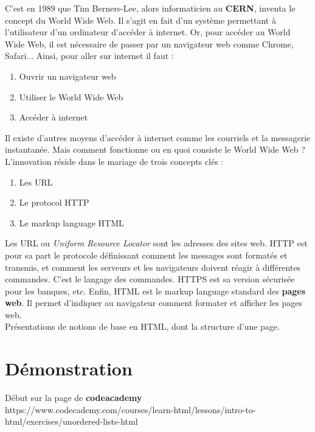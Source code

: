 \documentclass[12pt]{report}
\begin{document}
     C'est en 1989 que Tim Berners-Lee, alors informaticien au \textbf{CERN}, inventa le concept du World Wide Web. Il s'agit en fait d'un système permettant à l'utilisateur d'un ordinateur d'accéder à internet. Or, pour accéder au World Wide Web, il est nécessaire de passer par un navigateur web comme Chrome, Safari... Ainsi, pour aller sur internet il faut : \\
     \begin{enumerate}
      \item Ouvrir un navigateur web
      \item Utiliser le World Wide Web
      \item Accéder à internet
     \end{enumerate}
   Il existe d'autres moyens d'accéder à internet comme les courriels et la messagerie instantanée. Mais comment fonctionne ou en quoi consiste le World Wide Web ? \\ 
     
   L'innovation réside dans le mariage de trois concepts clés : \\
     \begin{enumerate}
      \item Les URL
      \item Le protocol HTTP
      \item Le markup language HTML
     \end{enumerate}
    
    Les URL ou \textit{Uniform Resource Locator} sont les adresses des sites web. HTTP est pour sa part le protocole définissant comment les messages sont formatés et transmis, et comment les serveurs et les navigateurs doivent réagir à différentes commandes. C'est le langage des commandes. HTTPS est sa version sécurisée pour les banques, etc. Enfin, HTML est le markup language standard des \textbf{pages web}. Il permet d'indiquer au navigateur comment formater et afficher les pages web. \\
    
    Présentations de notions de base en HTML, dont la structure d'une page.
    
    \section{Démonstration}
    
    Début sur la page de \textbf{codeacademy} https://www.codecademy.com/courses/learn-html/lessons/intro-to-html/exercises/unordered-lists-html \\
    
\end{document}
